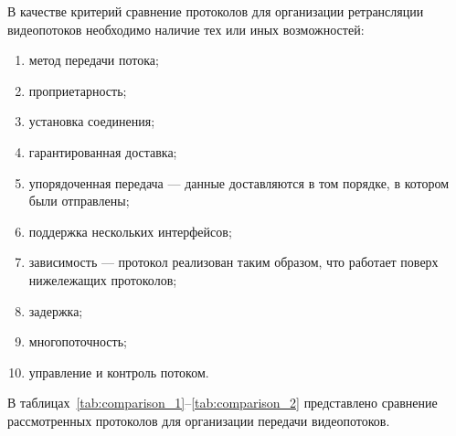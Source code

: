 В качестве критерий сравнение протоколов для организации ретрансляции видеопотоков необходимо наличие тех или иных возможностей:
\begin{enumerate}
	\item метод передачи потока;
	\item проприетарность;
	\item установка соединения;
	\item гарантированная доставка;
	\item упорядоченная передача --- данные доставляются в том порядке, в котором были отправлены;
	\item поддержка нескольких интерфейсов;
	\item зависимость --- протокол реализован таким образом, что работает поверх нижележащих протоколов;
	\item задержка;
	\item многопоточность;
	\item управление и контроль потоком.
\end{enumerate}

В таблицах~\ref{tab:comparison_1}--\ref{tab:comparison_2} представлено сравнение рассмотренных протоколов для организации передачи видеопотоков.

\clearpage

